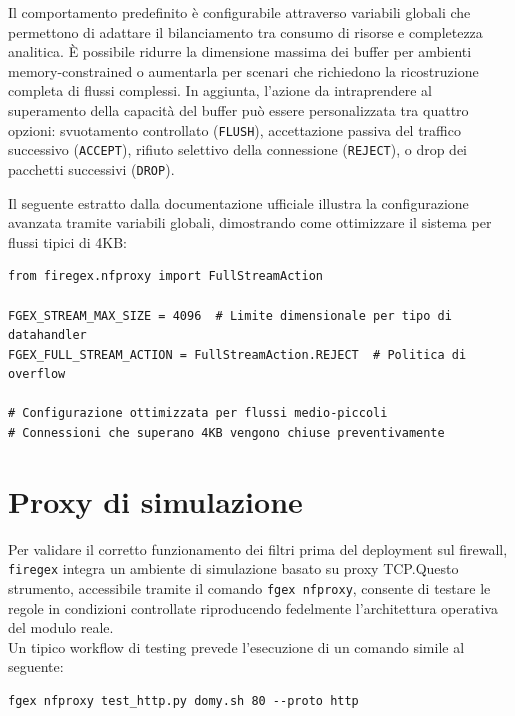 Il comportamento predefinito è configurabile attraverso variabili globali che permettono di adattare il bilanciamento tra consumo di risorse e completezza analitica. È possibile ridurre la dimensione massima dei buffer per ambienti memory-constrained o aumentarla per scenari che richiedono la ricostruzione completa di flussi complessi. In aggiunta, l'azione da intraprendere al superamento della capacità del buffer può essere personalizzata tra quattro opzioni: svuotamento controllato (\texttt{FLUSH}), accettazione passiva del traffico successivo (\texttt{ACCEPT}), rifiuto selettivo della connessione (\texttt{REJECT}), o drop dei pacchetti successivi (\texttt{DROP}).

Il seguente estratto dalla documentazione ufficiale illustra la configurazione avanzata tramite variabili globali, dimostrando come ottimizzare il sistema per flussi tipici di 4KB:\@

\begin{listing}[H]
    \begin{verbatim}
from firegex.nfproxy import FullStreamAction

FGEX_STREAM_MAX_SIZE = 4096  # Limite dimensionale per tipo di datahandler
FGEX_FULL_STREAM_ACTION = FullStreamAction.REJECT  # Politica di overflow

# Configurazione ottimizzata per flussi medio-piccoli
# Connessioni che superano 4KB vengono chiuse preventivamente
\end{verbatim}
\end{listing}

\section{Proxy di simulazione}

Per validare il corretto funzionamento dei filtri prima del deployment sul firewall, \texttt{firegex} integra un ambiente di simulazione basato su proxy TCP.\@ Questo strumento, accessibile tramite il comando \texttt{fgex nfproxy}, consente di testare le regole in condizioni controllate riproducendo fedelmente l'architettura operativa del modulo reale.\\
Un tipico workflow di testing prevede l'esecuzione di un comando simile al seguente:
\begin{listing}[H]
    \begin{verbatim}
fgex nfproxy test_http.py domy.sh 80 --proto http
\end{verbatim}
\end{listing}

